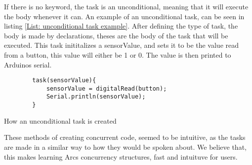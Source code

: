 If there is no keyword, the task is an unconditional, meaning that it will execute the body whenever it can. An example of an unconditional task, can be seen in listing \ref*{List: unconditional task example}. After defining the type of task, the body is made by declarations, theses are the body of the task that will be executed. This task inititalizes a sensorValue, and sets it to be the value read from a button, this value will either be 1 or 0. The value is then printed to Arduinos serial.

\begin{listing}[htb!]
    \begin{verbatim}
        task(sensorValue){
            sensorValue = digitalRead(button);
            Serial.println(sensorValue);
        }
    \end{verbatim}
    \caption{How an unconditional task is created}
    \label{List: unconditional task example}
\end{listing}

These methods of creating concurrent code, seemed to be intuitive, as the tasks are made in a similar way to how they would be spoken about. We believe that, this makes learning Arcs concurrency structures, fast and intuituve for users.










